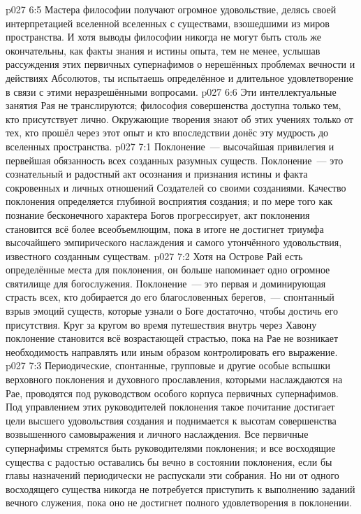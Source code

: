 \vs p027 6:5 Мастера философии получают огромное удовольствие, делясь своей интерпретацией вселенной вселенных с существами, взошедшими из миров пространства. И хотя выводы философии никогда не могут быть столь же окончательны, как факты знания и истины опыта, тем не менее, услышав рассуждения этих первичных супернафимов о нерешённых проблемах вечности и действиях Абсолютов, ты испытаешь определённое и длительное удовлетворение в связи с этими неразрешёнными вопросами.
\vs p027 6:6 Эти интеллектуальные занятия Рая не транслируются; философия совершенства доступна только тем, кто присутствует лично. Окружающие творения знают об этих учениях только от тех, кто прошёл через этот опыт и кто впоследствии донёс эту мудрость до вселенных пространства.
\vs p027 7:1 Поклонение~--- высочайшая привилегия и первейшая обязанность всех созданных разумных существ. Поклонение~--- это сознательный и радостный акт осознания и признания истины и факта сокровенных и личных отношений Создателей со своими созданиями. Качество поклонения определяется глубиной восприятия создания; и по мере того как познание бесконечного характера Богов прогрессирует, акт поклонения становится всё более всеобъемлющим, пока в итоге не достигнет триумфа высочайшего эмпирического наслаждения и самого утончённого удовольствия, известного созданным существам.
\vs p027 7:2 \pc Хотя на Острове Рай есть определённые места для поклонения, он больше напоминает одно огромное святилище для богослужения. Поклонение~--- это первая и доминирующая страсть всех, кто добирается до его благословенных берегов,~--- спонтанный взрыв эмоций существ, которые узнали о Боге достаточно, чтобы достичь его присутствия. Круг за кругом во время путешествия внутрь через Хавону поклонение становится всё возрастающей страстью, пока на Рае не возникает необходимость направлять или иным образом контролировать его выражение.
\vs p027 7:3 Периодические, спонтанные, групповые и другие особые вспышки верховного поклонения и духовного прославления, которыми наслаждаются на Рае, проводятся под руководством особого корпуса первичных супернафимов. Под управлением этих руководителей поклонения такое почитание достигает цели высшего удовольствия создания и поднимается к высотам совершенства возвышенного самовыражения и личного наслаждения. Все первичные супернафимы стремятся быть руководителями поклонения; и все восходящие существа с радостью оставались бы вечно в состоянии поклонения, если бы главы назначений периодически не распускали эти собрания. Но ни от одного восходящего существа никогда не потребуется приступить к выполнению заданий вечного служения, пока оно не достигнет полного удовлетворения в поклонении.
